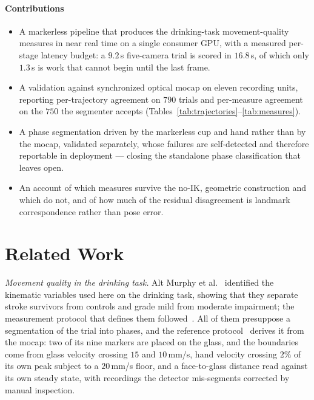 \documentclass[conference]{IEEEtran}
\begin{document}
\paragraph*{Contributions}
\begin{itemize}
  \item A markerless pipeline that produces the drinking-task movement-quality
        measures in near real time on a single consumer GPU, with a measured
        per-stage latency budget: a $9.2$\,s five-camera trial is scored in
        $16.8$\,s, of which only $1.3$\,s is work that cannot begin until the
        last frame.
  \item A validation against synchronized optical mocap on eleven recording
        units, reporting per-trajectory agreement on $790$ trials and
        per-measure agreement on the $750$ the segmenter accepts
        (Tables~\ref{tab:trajectories}--\ref{tab:measures}).
  \item A phase segmentation driven by the markerless cup and hand rather than
        by the mocap, validated separately, whose failures are self-detected and
        therefore reportable in deployment --- closing the standalone phase
        classification that~\cite{unger2024} leaves open.
  \item An account of which measures survive the no-IK, geometric construction
        and which do not, and of how much of the residual disagreement is
        landmark correspondence rather than pose error.
\end{itemize}

\section{Related Work}
\label{sec:relwork}

\emph{Movement quality in the drinking task.} Alt Murphy et
al.~\cite{murphy2011} identified the kinematic variables used here on the
drinking task, showing that they separate stroke survivors from controls and
grade mild from moderate impairment; the measurement protocol that defines
them followed~\cite{altmurphy2018}. All of them
presuppose a segmentation of the trial into phases, and the reference
protocol~\cite{altmurphy2018} derives it from the mocap: two of its nine markers
are placed on the glass, and the boundaries come from glass velocity crossing
$15$ and $10$\,mm/s, hand velocity crossing $2\%$ of its own peak subject to a
$20$\,mm/s floor, and a face-to-glass distance read against its own steady state,
with recordings the detector mis-segments corrected by manual inspection.
\end{document}
